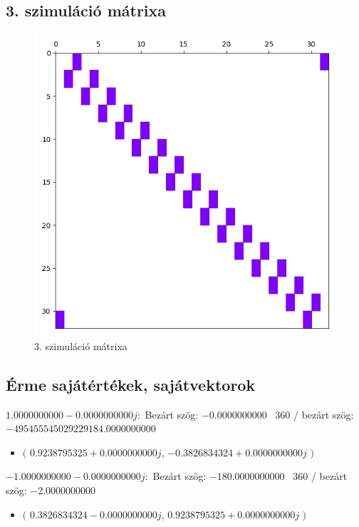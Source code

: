 \documentclass[14pt,a4paper]{article}
\begin{document}
\subsection{3. szimuláció mátrixa}
\begin{figure}[H]
\centering
\includegraphics[width = 0.7\columnwidth]{sim_03/simulation_matrix.jpg}
\caption{3. szimuláció mátrixa}
\end{figure}
\subsection{Érme sajátértékek, sajátvektorok}
$1.0000000000-0.0000000000j$:\
Bezárt szög: $-0.0000000000$ \
360 / bezárt szög: $-495455545029229184.0000000000$\
\begin{itemize}
\item
$\big($
$0.9238795325+0.0000000000j$, $-0.3826834324+0.0000000000j$
$\big)$
\end{itemize}
$-1.0000000000-0.0000000000j$:\
Bezárt szög: $-180.0000000000$ \
360 / bezárt szög: $-2.0000000000$\
\begin{itemize}
\item
$\big($
$0.3826834324-0.0000000000j$, $0.9238795325+0.0000000000j$
$\big)$
\end{itemize}
\end{document}
